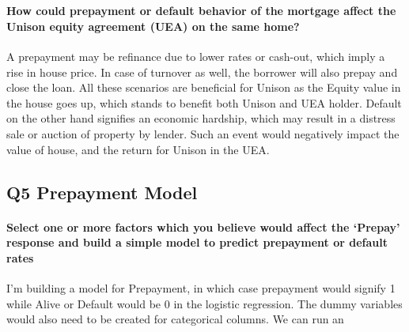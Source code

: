 \documentclass[11pt]{article}
\begin{document}
    \begin{center}
    \end{center}
    { \hspace*{\fill} \\}
    
    \hypertarget{how-could-prepayment-or-default-behavior-of-the-mortgage-affect-the-unison-equity-agreement-uea-on-the-same-home}{%
\paragraph{How could prepayment or default behavior of the mortgage
affect the Unison equity agreement (UEA) on the same
home?}\label{how-could-prepayment-or-default-behavior-of-the-mortgage-affect-the-unison-equity-agreement-uea-on-the-same-home}}

    A prepayment may be refinance due to lower rates or cash-out, which
imply a rise in house price. In case of turnover as well, the borrower
will also prepay and close the loan. All these scenarios are beneficial
for Unison as the Equity value in the house goes up, which stands to
benefit both Unison and UEA holder. Default on the other hand signifies
an economic hardship, which may result in a distress sale or auction of
property by lender. Such an event would negatively impact the value of
house, and the return for Unison in the UEA.

    \hypertarget{q5-prepayment-model}{%
\subsection{Q5 Prepayment Model}\label{q5-prepayment-model}}

\hypertarget{select-one-or-more-factors-which-you-believe-would-affect-the-prepay-response-and-build-a-simple-model-to-predict-prepayment-or-default-rates}{%
\paragraph{Select one or more factors which you believe would affect the
`Prepay' response and build a simple model to predict prepayment or
default
rates}\label{select-one-or-more-factors-which-you-believe-would-affect-the-prepay-response-and-build-a-simple-model-to-predict-prepayment-or-default-rates}}

    I'm building a model for Prepayment, in which case prepayment would
signify 1 while Alive or Default would be 0 in the logistic regression.
The dummy variables would also need to be created for categorical
columns. We can run an
\end{document}

